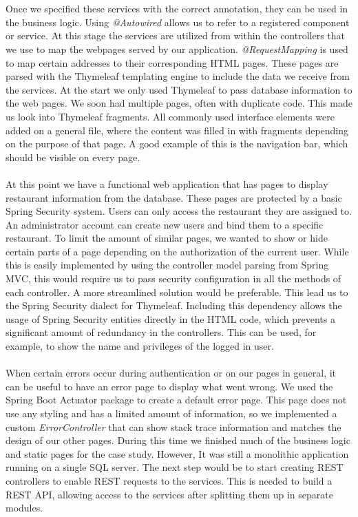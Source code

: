 \documentclass[12pt]{article}
\begin{document}
\begin{multicols}{2}
\\\\
Once we specified these services with the correct annotation, they can be used in the business logic. Using \textit{@Autowired} allows us to refer to a registered component or service. At this stage the services are utilized from within the controllers that we use to map the webpages served by our application. \textit{@RequestMapping} is used to map certain addresses to their corresponding HTML pages. These pages are parsed with the Thymeleaf templating engine to include the data we receive from the services. At the start we only used Thymeleaf to pass database information to the web pages. We soon had multiple pages, often with duplicate code. This made us look into Thymeleaf fragments. All commonly used interface elements were added on a general file, where the content was filled in with fragments depending on the purpose of that page. A good example of this is the navigation bar, which should be visible on every page.
\\\\
At this point we have a functional web application that has pages to display restaurant information from the database. These pages are protected by a basic Spring Security system. Users can only access the restaurant they are assigned to. An administrator account can create new users and bind them to a specific restaurant. To limit the amount of similar pages, we wanted to show or hide certain parts of a page depending on the authorization of the current user. While this is easily implemented by using the controller model parsing from Spring MVC, this would require us to pass security configuration in all the methods of each controller. A more streamlined solution would be preferable. This lead us to the Spring Security dialect for Thymeleaf. Including this dependency allows the usage of Spring Security entities directly in the HTML code, which prevents a significant amount of redundancy in the controllers. This can be used, for example, to show the name and privileges of the logged in user.
\\\\
When certain errors occur during authentication or on our pages in general, it can be useful to have an error page to display what went wrong. We used the Spring Boot Actuator package to create a default error page. This page does not use any styling and has a limited amount of information, so we implemented a custom \textit{ErrorController} that can show stack trace information and matches the design of our other pages. During this time we finished much of the business logic and static pages for the case study. However, It was still a monolithic application running on a single SQL server. The next step would be to start creating REST controllers to enable REST requests to the services. This is needed to build a REST API, allowing access to the services after splitting them up in separate modules.

\end{multicols}
\end{document}
